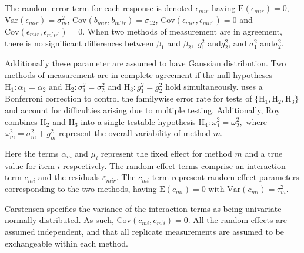 \documentclass[12pt, a4paper]{report}
\theoremstyle{plain}
\theoremstyle{definition}
\theoremstyle{remark}
\begin{document}
The random error term for each response is denoted $\epsilon_{mir}$ having $\mathrm{E}(\epsilon_{mir})=0$, $\mathrm{Var}(\epsilon_{mir})=\sigma^2_m$, $\mathrm{Cov}(b_{mir}, b_{m^\prime ir})=\sigma_{12}$, $\mathrm{Cov}(\epsilon_{mir}, \epsilon_{mir^\prime})= 0$ and $\mathrm{Cov}(\epsilon_{mir}, \epsilon_{m^\prime ir^\prime})= 0.$
When two methods of measurement are in agreement, there is no significant differences between $\beta_1$ and $\beta_2,$ $g^2_1 $ and$ g^2_2$, and $\sigma^2_1 $ and$ \sigma^2_2$.
\bigskip



Additionally these parameter are assumed to have Gaussian distribution. Two methods of measurement are in complete agreement if the null hypotheses $\mathrm{H}_1\colon \alpha_1 = \alpha_2$ and $\mathrm{H}_2\colon \sigma^2_1 = \sigma^2_2 $ and $\mathrm{H}_3\colon g^2_1= g^2_2$ hold simultaneously. \citet{roy} uses a Bonferroni correction to control the familywise error rate for tests of $\{\mathrm{H}_1, \mathrm{H}_2, \mathrm{H}_3\}$ and account for difficulties arising due to multiple testing. Additionally, Roy combines $\mathrm{H}_2$ and $\mathrm{H}_3$ into a single testable hypothesis $\mathrm{H}_4\colon \omega^2_1=\omega^2_2,$ where $\omega^2_m = \sigma^2_m + g^2_m$ represent the overall variability of method $m.$



Here the terms $\alpha_{m}$ and $\mu_{i}$ represent the fixed effect for method $m$ and a true value for item $i$ respectively. The random effect terms comprise an interaction term $c_{mi}$ and the residuals $\varepsilon_{mir}$.
The $c_{mi}$ term represent random effect parameters corresponding to the two methods, having $\mathrm{E}(c_{mi})= 0$ with $\mathrm{Var}(c_{mi})=\tau^2_m$.  

Carstensen specifies the variance of the interaction terms as being univariate normally distributed. As such, $\mathrm{Cov}(c_{mi}, c_{m^\prime i})= 0.$ All the random effects are assumed independent, and that all replicate measurements are assumed to be exchangeable within each method.
\end{document}

